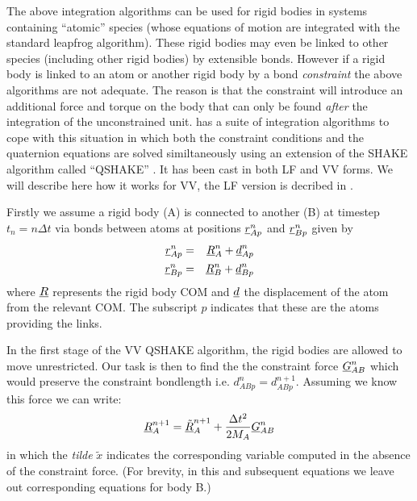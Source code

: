 The above integration algorithms can be used for rigid
bodies in systems containing ``atomic'' species
(whose equations of motion are integrated with the standard leapfrog
algorithm). These rigid bodies may even be linked to
other species (including other rigid bodies) by
extensible bonds. However if a rigid body is linked
to an atom or another rigid body by a bond {\em
constraint} the above algorithms are not
adequate. The reason is that the constraint will introduce an
additional force and torque on the body that can only be found {\em
after} the integration of the unconstrained unit. \D{} has a suite of
integration algorithms to cope with this situation in which both the
constraint conditions and the quaternion equations are solved
similtaneously using an extension of the SHAKE algorithm called
``QSHAKE'' \cite{forester-96a}. It has been
cast in both LF and VV forms. We will describe here how it works for
VV, the LF version is decribed in \cite{forester-96a}.

Firstly we assume a rigid body (A) is connected to another (B) at
timestep $t_n=n\Delta t$ via bonds between atoms at positions
$\mbox{$\underline{r}$}_{Ap}^{n}$ and $\mbox{$\underline{r}$}_{Bp}^{n}$ given by
\begin{eqnarray}
\mbox{$\underline{r}$}_{Ap}^{n}&=&\mbox{$\underline{R}$}_{A}^{n}+\mbox{$\underline{d}$}_{Ap}^{n} \nonumber \\
\mbox{$\underline{r}$}_{Bp}^{n}&=&\mbox{$\underline{R}$}_{B}^{n}+\mbox{$\underline{d}$}_{Bp}^{n}
\end{eqnarray}
where $\mbox{$\underline{R}$}$ represents the rigid body COM and $\mbox{$\underline{d}$}$ the
displacement of the atom from the relevant COM. The subscript $p$
indicates that these are the atoms providing the links.

In the first stage of the VV QSHAKE algorithm, the rigid bodies are allowed
to move unrestricted. Our task is then to find the the constraint
force $\mbox{$\underline{G}$}_{AB}^{n}$ which would preserve the constraint
bondlength i.e. $d_{ABp}^{n}=d_{ABp}^{n+1}$. Assuming we know this
force we can write:
\begin{equation}
\mbox{$\underline{R}$}_{A}^{n+1}=\mbox{$\underline{\tilde{R}}$}_{A}^{n+1}+{\Delta t^2 \over 2M_{A}}
\mbox{$\underline{G}$}_{AB}^{n} \label{move}
\end{equation}
in which the {\em tilde} $\tilde{x}$ indicates the corresponding variable computed
in the absence of the constraint force. (For brevity, in this and subsequent
equations we leave out corresponding equations for body B.)

